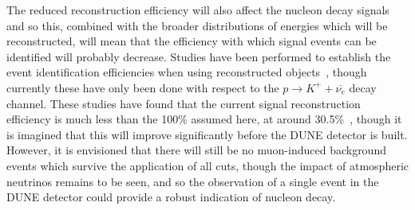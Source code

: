 The reduced reconstruction efficiency will also affect the nucleon decay signals and so this, combined with the broader distributions of energies which will be reconstructed, will mean that the efficiency with which signal events can be identified will probably decrease. Studies have been performed to establish the event identification efficiencies when using reconstructed objects~\citep{KevinSeptCollab, AAron_17_02_08, Tingjun_17_02_08, Aaron_17_03_01}, though currently these have only been done with respect to the $p \rightarrow K^{+} + \overline{\nu_{e}}$ decay channel. These studies have found that the current signal reconstruction efficiency is much less than the 100\% assumed here, at around 30.5\%~\citep{AAron_17_02_08}, though it is imagined that this will improve significantly before the DUNE detector is built. \\

However, it is envisioned that there will still be no muon-induced background events which survive the application of all cuts, though the impact of atmospheric neutrinos remains to be seen, and so the observation of a single event in the DUNE detector could provide a robust indication of nucleon decay. \\
